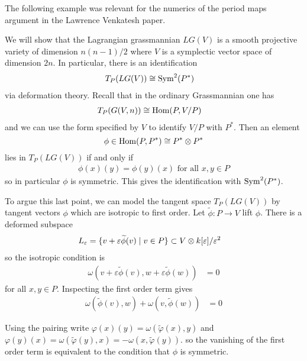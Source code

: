 \documentclass[12pt]{article}
\begin{document}
The following example was relevant for the numerics of the period maps argument in the Lawrence Venkatesh paper.
\begin{example}
     We will show that the Lagrangian grassmannian $LG(V)$ is a smooth projective variety of dimension $n(n-1)/2$ where $V$ is a symplectic vector space of dimension $2n$. In particular, there is an identification \begin{align*}
        T_P(LG(V)) &\cong \operatorname{Sym}^2(P^*)
    \end{align*} via deformation theory. Recall that in the ordinary Grassmannian one has \begin{align*}
        T_P(G(V,n)) &\cong \operatorname{Hom}(P,V/P)
    \end{align*} and we can use the form specified by $V$ to identify $V/P$ with $P^*$. Then an element $$\phi \in \operatorname{Hom}(P,P^*) \cong P^* \otimes P^*$$ lies in $T_P(LG(V))$ if and only if \begin{align*}
        \phi(x)(y) = \phi(y)(x) \text{ for all } x,y \in P
    \end{align*} so in particular $\phi$ is symmetric. This gives the identification with $\operatorname{Sym}^2(P^*)$.
\end{example} To argue this last point, we can model the tangent space $T_P(LG(V))$ by tangent vectors $\phi$ which are isotropic to first order. Let $\widetilde{\phi}:P \to V$ lift $\phi$. There is a deformed subspace \begin{align*}
    L_\varepsilon &= \{v + \varepsilon \widetilde{\phi}(v) \mid v \in P\} \subset V \otimes k[\varepsilon] / \varepsilon^2 
\end{align*} so the isotropic condition is \begin{align*}
    \omega(v + \varepsilon \widetilde{\phi}(v), w + \varepsilon \widetilde{\phi}(w)) &= 0 
\end{align*} for all $x,y \in P$. Inspecting the first order term gives \begin{align*}
    \omega(\widetilde{\phi}(v), w) + \omega(v, \widetilde{\phi}(w)) &= 0 
\end{align*}

Using the pairing write $\varphi(x)(y) = \omega(\tilde{\varphi}(x), y) $ and $ \varphi(y)(x) = \omega(\tilde{\varphi}(y), x) = -\omega(x, \tilde{\varphi}(y)).$ so the vanishing of the first order term is equivalent to the condition that $\phi$ is symmetric.
\end{document}
